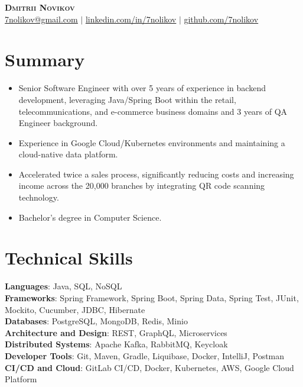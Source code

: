 \documentclass[letterpaper,11pt]{article}
\newcommand{\resumeItem}[1]{
  \item\small{
    \begin{minipage}[t]{0.99\linewidth} %
      {#1}
    \end{minipage}
    \vspace{1pt} %
  }
}
\newcommand{\resumeItemListStart}{\begin{itemize}}
\newcommand{\resumeItemListEnd}{\end{itemize}\vspace{-5pt}}
\begin{document}
\begin{center}
    \textbf{\Huge \scshape Dmitrii Novikov} \\ \vspace{1pt}
    \small \href{mailto:7nolikov@gmail.com}{\underline{7nolikov@gmail.com}} $|$ 
    \href{https://www.linkedin.com/in/7nolikov}{\underline{linkedin.com/in/7nolikov}} $|$
    \href{https://github.com/7nolikov}{\underline{github.com/7nolikov}}
\end{center}


\section{Summary}
    \resumeItemListStart
        \resumeItem{Senior Software Engineer with over 5 years of experience in backend development, leveraging Java/Spring Boot within the retail, telecommunications, and e-commerce business domains and 3 years of QA Engineer background.}
        \resumeItem{Experience in Google Cloud/Kubernetes environments and maintaining a cloud-native data platform.}
        \resumeItem{Accelerated twice a sales process, significantly reducing costs and increasing income across the 20,000 branches by integrating QR code scanning technology.}
        \resumeItem{Bachelor's degree in Computer Science.}
    \resumeItemListEnd


\section{Technical Skills}
\begin{itemize}[leftmargin=0.15in, label={}]
    \small{\item{
    \textbf{Languages}{: Java, SQL, NoSQL } \\
    \textbf{Frameworks}{: Spring Framework, Spring Boot, Spring Data, Spring Test, JUnit, Mockito, Cucumber, JDBC, Hibernate} \\
    \textbf{Databases}{: PostgreSQL, MongoDB, Redis, Minio} \\
    \textbf{Architecture and Design}{: REST, GraphQL, Microservices} \\
    \textbf{Distributed Systems}{: Apache Kafka, RabbitMQ, Keycloak}\\
    \textbf{Developer Tools}{: Git, Maven, Gradle, Liquibase, Docker, IntelliJ, Postman} \\
    \textbf{CI/CD and Cloud}{: GitLab CI/CD, Docker, Kubernetes, AWS, Google Cloud Platform}\\
    }}
\end{itemize}
\end{document}

